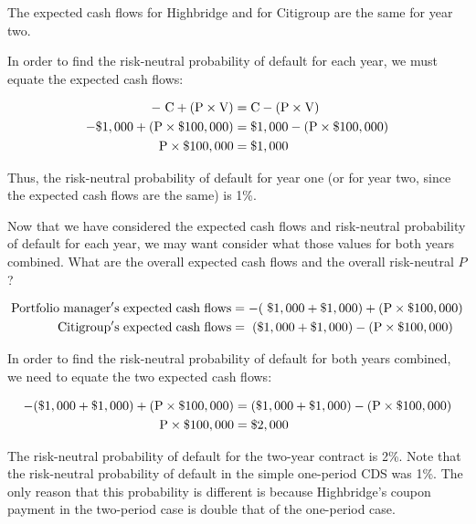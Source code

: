 \documentclass{jss}
\begin{document}
The expected cash flows for Highbridge and for Citigroup are the same for year two. 

In order to find the risk-neutral probability of default for each year, we must equate the expected cash flows:

\label{eqn:SimpleTwoPeriod}
\begin{align}
  \rm -\hspace{3pt}C + (P \times V)  &= \rm C - (P \times V) \\
  \rm - \$1,000 + (P \times \$100,000) &= \rm \$1,000 - (P \times \$100,000) \\
  \rm P \times {\$100,000}  &= \rm \$1,000
\end{align}


Thus, the risk-neutral probability of default for year one (or for year two, since the expected cash flows are the same) is 1\%. 

Now that we have considered the expected cash flows and risk-neutral probability of default for each year, we may want consider what those values for both years combined. What are the overall expected cash flows and the overall risk-neutral $P$?

\begin{align}
  \rm Portfolio\hspace{3pt}manager's\hspace{3pt}expected\hspace{3pt}cash\hspace{3pt}flows &= \rm -(\hspace{3pt}\$1,000 + \$1,000) + (P \times {\$100,000}) \\
  \rm Citigroup's\hspace{3pt}expected\hspace{3pt}cash\hspace{3pt}flows &= \rm \hspace{3pt}(\$1,000 + \$1,000) - (P \times {\$100,000})
  \end{align}

In order to find the risk-neutral probability of default for both years combined, we need to equate the two expected cash flows:

\begin{align}
  \rm - (\$1,000 + \$1,000) + (P \times \$100,000) &= \rm (\$1,000 + \$1,000) - (P \times \$100,000) \label{eqn:twoPeriod}\\
  \rm P \times {\$100,000}  &= \rm \$2,000
\end{align}

The risk-neutral probability of default for the two-year contract is 2\%. Note that the risk-neutral probability of default in the simple one-period CDS was 1\%. The only reason that this probability is different is because Highbridge's coupon payment in the two-period case is double that of the one-period case.
\end{document}
